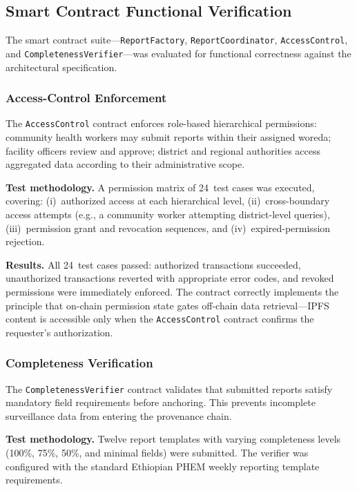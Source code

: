 \subsection{Smart Contract Functional Verification}\label{subsec:contract_eval}

The smart contract suite---\texttt{ReportFactory}, \texttt{ReportCoordinator}, \texttt{AccessControl}, and \texttt{CompletenessVerifier}---was evaluated for functional correctness against the architectural specification.

\subsubsection{Access-Control Enforcement}

The \texttt{AccessControl} contract enforces role-based hierarchical permissions: community health workers may submit reports within their assigned woreda; facility officers review and approve; district and regional authorities access aggregated data according to their administrative scope.

\textbf{Test methodology.} A permission matrix of 24~test cases was executed, covering: (i)~authorized access at each hierarchical level, (ii)~cross-boundary access attempts (e.g., a community worker attempting district-level queries), (iii)~permission grant and revocation sequences, and (iv)~expired-permission rejection.

\textbf{Results.} All 24~test cases passed: authorized transactions succeeded, unauthorized transactions reverted with appropriate error codes, and revoked permissions were immediately enforced. The contract correctly implements the principle that on-chain permission state gates off-chain data retrieval---IPFS content is accessible only when the \texttt{AccessControl} contract confirms the requester's authorization.

\subsubsection{Completeness Verification}

The \texttt{CompletenessVerifier} contract validates that submitted reports satisfy mandatory field requirements before anchoring. This prevents incomplete surveillance data from entering the provenance chain.

\textbf{Test methodology.} Twelve report templates with varying completeness levels (100\%, 75\%, 50\%, and minimal fields) were submitted. The verifier was configured with the standard Ethiopian PHEM weekly reporting template requirements.

